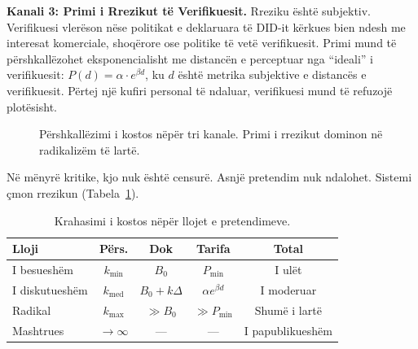 \documentclass[11pt,a4paper,twocolumn]{article}
\begin{document}
\textbf{Kanali 3: Primi i Rrezikut të Verifikuesit.} Rreziku është subjektiv. Verifikuesi vlerëson nëse politikat e deklaruara të DID-it kërkues bien ndesh me interesat komerciale, shoqërore ose politike të vetë verifikuesit. Primi mund të përshkallëzohet eksponencialisht me distancën e perceptuar nga ``ideali'' i verifikuesit: $P(d) = \alpha \cdot e^{\beta d}$, ku $d$ është metrika subjektive e distancës e verifikuesit. Përtej një kufiri personal të ndaluar, verifikuesi mund të refuzojë plotësisht.

\begin{figure}[ht]
\centering
{}
\caption{Përshkallëzimi i kostos nëpër tri kanale. Primi i rrezikut dominon në radikalizëm të lartë.}
\label{fig:radicalism}
\end{figure}

Në mënyrë kritike, kjo nuk është censurë. Asnjë pretendim nuk ndalohet. Sistemi çmon rrezikun (Tabela~\ref{tab:costs}).

\begin{table}[ht]
\centering
\caption{Krahasimi i kostos nëpër llojet e pretendimeve.}
\label{tab:costs}
\footnotesize
\begin{tabular}{@{}lcccc@{}}
\toprule
\textbf{Lloji} & \textbf{Përs.} & \textbf{Dok} & \textbf{Tarifa} & \textbf{Total} \\
\midrule
I besueshëm & $k_{\min}$ & $B_0$ & $P_{\min}$ & I ulët \\
I diskutueshëm & $k_{\text{med}}$ & $B_0{+}k\Delta$ & $\alpha e^{\beta d}$ & I moderuar \\
Radikal & $k_{\max}$ & $\gg B_0$ & $\gg P_{\min}$ & Shumë i lartë \\
Mashtrues & $\to\infty$ & --- & --- & I papublikueshëm \\
\bottomrule
\end{tabular}
\end{table}
\end{document}

